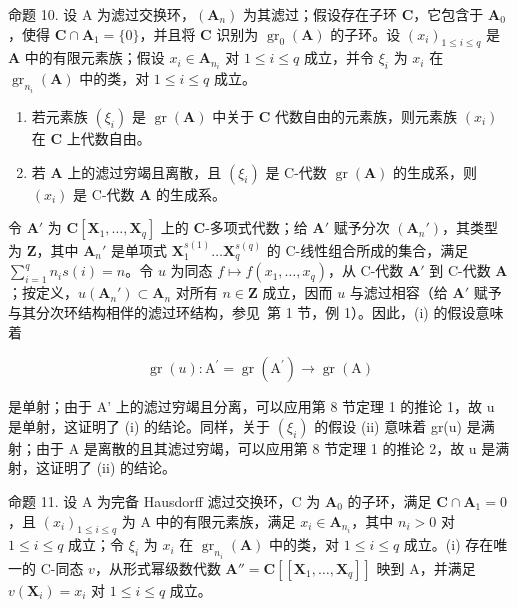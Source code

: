 	命题 10. 设 A 为滤过交换环，\((\mathbf{A}_n)\) 为其滤过；假设存在子环 \(\mathbf{C}\)，它包含于 \(\mathbf{A}_0\)，使得 \(\mathbf{C} \cap \mathbf{A}_1 = \{0\}\)，并且将 \(\mathbf{C}\) 识别为 \(\operatorname{gr}_0(\mathbf{A})\) 的子环。设 \((x_i)_{1 \leqslant i \leqslant q}\) 是 \(\mathbf{A}\) 中的有限元素族；假设 \(x_i \in \mathbf{A}_{n_i}\) 对 \(1 \leqslant i \leqslant q\) 成立，并令 \(\xi_i\) 为 \(x_i\) 在 \(\operatorname{gr}_{n_i}(\mathbf{A})\) 中的类，对 \(1 \leqslant i \leqslant q\) 成立。

\begin{enumerate}
\def\labelenumi{(\roman{enumi})}
\item
	  若元素族 \((\xi_{i})\) 是 \(\operatorname{gr}(\mathbf{A})\) 中关于 \(\mathbf{C}\) 代数自由的元素族，则元素族 \((x_{i})\) 在 \(\mathbf{C}\) 上代数自由。
\item
  若 \(\mathbf{A}\) 上的滤过穷竭且离散，且 \((\xi_{i})\) 是 C-代数 \(\operatorname{gr}(\mathbf{A})\) 的生成系，则 \((x_{i})\) 是 C-代数 \(\mathbf{A}\) 的生成系。
\end{enumerate}

	令 \(\mathbf{A}'\) 为 \(\mathbf{C}[\mathbf{X}_1, \ldots, \mathbf{X}_q]\) 上的 \(\mathbf{C}\)-多项式代数；给 \(\mathbf{A}'\) 赋予分次 \((\mathbf{A}_n')\)，其类型为 \(\mathbf{Z}\)，其中 \(\mathbf{A}_n'\) 是单项式 \(\mathbf{X}_1^{s(1)} \ldots \mathbf{X}_q^{s(q)}\) 的 C-线性组合所成的集合，满足 \(\sum_{i=1}^{q} n_i s(i) = n\)。令 \(u\) 为同态 \(f \mapsto f(x_1, \ldots, x_q)\)，从 C-代数 \(\mathbf{A}'\) 到 C-代数 \(\mathbf{A}\)；按定义，\(u(\mathbf{A}_n') \subset \mathbf{A}_n\) 对所有 \(n \in \mathbf{Z}\) 成立，因而 \(u\) 与滤过相容（给 \(\mathbf{A}'\) 赋予与其分次环结构相伴的滤过环结构，参见~第 1 节，例 1）。因此，(i) 的假设意味着

\[
\operatorname{gr} (u): \mathrm{A} ^ {\prime} = \operatorname{gr} (\mathrm{A} ^ {\prime}) \rightarrow \operatorname{gr} (\mathrm{A})
\]

是单射；由于 A' 上的滤过穷竭且分离，可以应用第 8 节定理 1 的推论 1，故 u 是单射，这证明了 (i) 的结论。同样，关于 \((\xi_{i})\) 的假设 (ii) 意味着 gr(u) 是满射；由于 A 是离散的且其滤过穷竭，可以应用第 8 节定理 1 的推论 2，故 u 是满射，这证明了 (ii) 的结论。

	命题 11. 设 A 为完备 Hausdorff 滤过交换环，C 为 \(\mathbf{A}_0\) 的子环，满足 \(\mathbf{C} \cap \mathbf{A}_1 = 0\)，且 \((x_i)_{1 \leqslant i \leqslant q}\) 为 A 中的有限元素族，满足 \(x_i \in \mathbf{A}_{n_i}\)，其中 \(n_i > 0\) 对 \(1 \leqslant i \leqslant q\) 成立；令 \(\xi_i\) 为 \(x_i\) 在 \(\operatorname{gr}_{n_i}(\mathbf{A})\) 中的类，对 \(1 \leqslant i \leqslant q\) 成立。(i) 存在唯一的 C-同态 \(v\)，从形式幂级数代数 \(\mathbf{A}'' = \mathbf{C}[[\mathbf{X}_1, \ldots, \mathbf{X}_q]]\) 映到 A，并满足 \(v(\mathbf{X}_i) = x_i\) 对 \(1 \leqslant i \leqslant q\) 成立。

